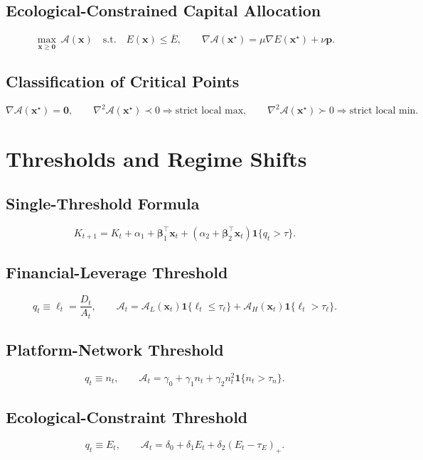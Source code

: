 \documentclass[11pt]{article}
\begin{document}
\subsection{Ecological-Constrained Capital Allocation}
\[
\max_{\bm{x}\ge\bm{0}}\ \mathcal{A}(\bm{x})
\quad\text{s.t.}\quad E(\bm{x})\le \overline{E},
\qquad \nabla\mathcal{A}(\bm{x}^{\star})=\mu\nabla E(\bm{x}^{\star})+\nu\bm{p}.
\]

\subsection{Classification of Critical Points}
\[
\nabla\mathcal{A}(\bm{x}^{\star})=\bm{0},
\qquad \nabla^2\mathcal{A}(\bm{x}^{\star})\prec 0\Rightarrow \text{strict local max},
\qquad \nabla^2\mathcal{A}(\bm{x}^{\star})\succ 0\Rightarrow \text{strict local min}.
\]

\section{Thresholds and Regime Shifts}

\subsection{Single-Threshold Formula}
\[
K_{t+1}=K_t+\alpha_1+\bm{\beta}_1^\top\bm{x}_t+\left(\alpha_2+\bm{\beta}_2^\top\bm{x}_t\right)\mathbf{1}\{q_t>\tau\}.
\]

\subsection{Financial-Leverage Threshold}
\[
q_t\equiv \ell_t=\frac{D_t}{A_t},
\qquad \mathcal{A}_t=\mathcal{A}_L(\bm{x}_t)\mathbf{1}\{\ell_t\le\tau_\ell\}+\mathcal{A}_H(\bm{x}_t)\mathbf{1}\{\ell_t>\tau_\ell\}.
\]

\subsection{Platform-Network Threshold}
\[
q_t\equiv n_t,
\qquad \mathcal{A}_t=\gamma_0+\gamma_1 n_t+\gamma_2 n_t^2\mathbf{1}\{n_t>\tau_n\}.
\]

\subsection{Ecological-Constraint Threshold}
\[
q_t\equiv E_t,
\qquad \mathcal{A}_t=\delta_0+\delta_1 E_t+\delta_2(E_t-\tau_E)_+.
\]
\end{document}
